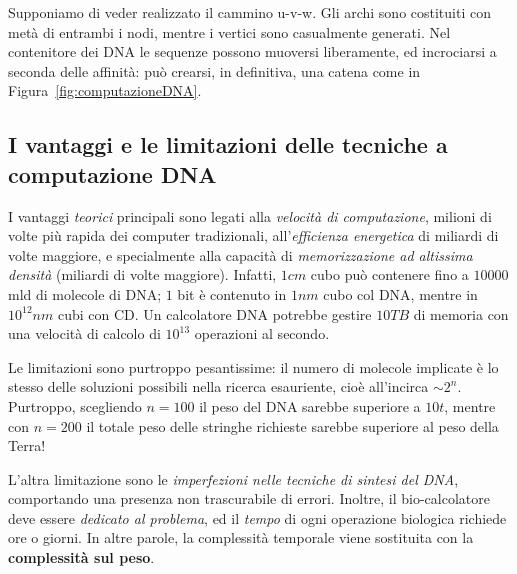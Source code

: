 \documentclass[10pt]{\classname}
\theoremstyle{definition}
\theoremstyle{definition}
\theoremstyle{definition}
\theoremstyle{definition}
\begin{document}
Supponiamo di veder realizzato il cammino u-v-w. Gli archi sono costituiti con
metà di entrambi i nodi, mentre i vertici sono casualmente generati. Nel
contenitore dei DNA le sequenze possono muoversi liberamente, ed incrociarsi a
seconda delle affinità: può crearsi, in definitiva, una catena come in
Figura~\ref{fig:computazioneDNA}.

\subsection{I vantaggi e le limitazioni delle tecniche a computazione DNA}

I vantaggi \emph{teorici} principali sono legati alla \emph{velocità di
computazione}, milioni di volte più rapida dei computer tradizionali,
all'\emph{efficienza energetica} di miliardi di volte maggiore, e specialmente
alla capacità di \emph{memorizzazione ad altissima densità} (miliardi di
volte maggiore). Infatti, $1cm$ cubo può contenere fino a $10000$ mld di
molecole di DNA; $1$ bit è contenuto in $1nm$ cubo col DNA, mentre in $10^{12}nm$
cubi con CD. Un calcolatore DNA potrebbe gestire $10TB$ di memoria con una
velocità di calcolo di $10^{13}$ operazioni al secondo.

Le limitazioni sono purtroppo pesantissime: il numero di molecole implicate è
lo stesso delle soluzioni possibili nella ricerca esauriente, cioè all'incirca
$\sim 2^n$. Purtroppo, scegliendo $n=100$ il peso del DNA sarebbe superiore a
$10t$, mentre con $n=200$ il totale peso delle stringhe richieste sarebbe
superiore al peso della Terra!

L'altra limitazione sono le \emph{imperfezioni nelle tecniche di sintesi del
DNA}, comportando una presenza non trascurabile di errori. Inoltre, il
bio-calcolatore deve essere \emph{dedicato al problema}, ed il \emph{tempo} di
ogni operazione biologica richiede ore o giorni. In altre parole, la
complessità temporale viene sostituita con la \textbf{complessità sul peso}.
\end{document}
